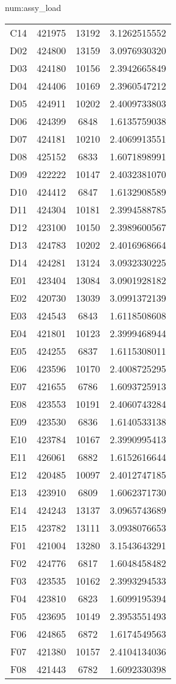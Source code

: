 \begin{numitem}{num:assy_load}
\begin{center}
\begin{longtable}{c c c c}
C14&421975&13192&3.1262515552\\
D02&424800&13159&3.0976930320\\
D03&424180&10156&2.3942665849\\
D04&424406&10169&2.3960547212\\
D05&424911&10202&2.4009733803\\
D06&424399&6848 &1.6135759038\\
D07&424181&10210&2.4069913551\\
D08&425152&6833 &1.6071898991\\
D09&422222&10147&2.4032381070\\
D10&424412&6847 &1.6132908589\\
D11&424304&10181&2.3994588785\\
D12&423100&10150&2.3989600567\\
D13&424783&10202&2.4016968664\\
D14&424281&13124&3.0932330225\\
E01&423404&13084&3.0901928182\\
E02&420730&13039&3.0991372139\\
E03&424543&6843 &1.6118508608\\
E04&421801&10123&2.3999468944\\
E05&424255&6837 &1.6115308011\\
E06&423596&10170&2.4008725295\\
E07&421655&6786 &1.6093725913\\
E08&423553&10191&2.4060743284\\
E09&423530&6836 &1.6140533138\\
E10&423784&10167&2.3990995413\\
E11&426061&6882 &1.6152616644\\
E12&420485&10097&2.4012747185\\
E13&423910&6809 &1.6062371730\\
E14&424243&13137&3.0965743689\\
E15&423782&13111&3.0938076653\\
F01&421004&13280&3.1543643291\\
F02&424776&6817 &1.6048458482\\
F03&423535&10162&2.3993294533\\
F04&423810&6823 &1.6099195394\\
F05&423695&10149&2.3953551493\\
F06&424865&6872 &1.6174549563\\
F07&421380&10157&2.4104134036\\
F08&421443&6782 &1.6092330398\\

\end{longtable}
\end{center}
\end{numitem}
